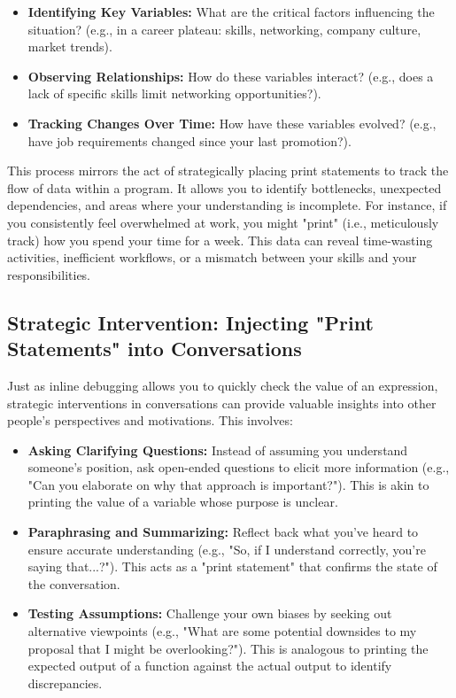 \documentclass{article}
\begin{document}
{{{{\begin{itemize}
    \item \textbf{Identifying Key Variables:} What are the critical factors influencing the situation? (e.g., in a career plateau: skills, networking, company culture, market trends).
    \item \textbf{Observing Relationships:} How do these variables interact? (e.g., does a lack of specific skills limit networking opportunities?).
    \item \textbf{Tracking Changes Over Time:} How have these variables evolved? (e.g., have job requirements changed since your last promotion?).
\end{itemize}

This process mirrors the act of strategically placing print statements to track the flow of data within a program. It allows you to identify bottlenecks, unexpected dependencies, and areas where your understanding is incomplete. For instance, if you consistently feel overwhelmed at work, you might "print" (i.e., meticulously track) how you spend your time for a week. This data can reveal time-wasting activities, inefficient workflows, or a mismatch between your skills and your responsibilities.

\subsection*{Strategic Intervention: Injecting "Print Statements" into Conversations}

Just as inline debugging allows you to quickly check the value of an expression, strategic interventions in conversations can provide valuable insights into other people's perspectives and motivations. This involves:

\begin{itemize}
    \item \textbf{Asking Clarifying Questions:} Instead of assuming you understand someone's position, ask open-ended questions to elicit more information (e.g., "Can you elaborate on why that approach is important?"). This is akin to printing the value of a variable whose purpose is unclear.
    \item \textbf{Paraphrasing and Summarizing:} Reflect back what you've heard to ensure accurate understanding (e.g., "So, if I understand correctly, you're saying that...?"). This acts as a "print statement" that confirms the state of the conversation.
    \item \textbf{Testing Assumptions:} Challenge your own biases by seeking out alternative viewpoints (e.g., "What are some potential downsides to my proposal that I might be overlooking?"). This is analogous to printing the expected output of a function against the actual output to identify discrepancies.
\end{itemize}

}}}}
\end{document}
